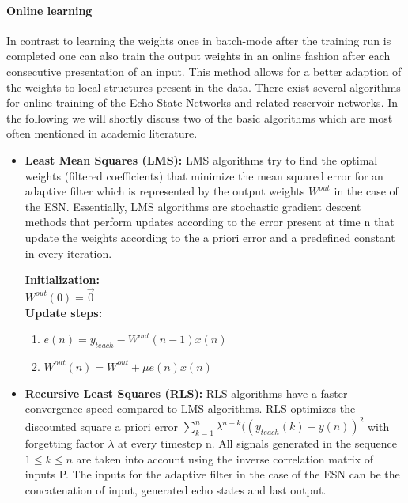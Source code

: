 \paragraph*{Online learning}
In contrast to learning the weights once in batch-mode after the training run is completed one can also train the output weights in an online fashion after each consecutive presentation of an input. This method allows for a better adaption of the weights to local structures present in the data. There exist several algorithms for online training of the Echo State Networks and related reservoir networks. In the following we will shortly discuss two of the basic algorithms which are most often mentioned in academic literature. 
\begin{itemize}
\item \textbf{Least Mean Squares (LMS):} LMS algorithms try to find the optimal weights (filtered coefficients) that minimize the mean squared error for an adaptive filter which is represented by the output weights $W^{out}$ in the case of the ESN. Essentially, LMS algorithms are stochastic gradient descent methods that perform updates according to the error present at time n that update the weights according to the a priori error and a predefined constant in every iteration.\\
\indent
\begin{algorithm}[H]
\textbf{Initialization:}\\
$W^{out}(0) = \vec{0}$\\
\textbf{Update steps:}\\
\begin{enumerate}
\item $e(n) = y_{teach}-W^{out}(n-1)x(n)$
\item $W^{out}(n)=W^{out}+\mu e(n)x(n)$
\end{enumerate}
\end{algorithm}
\item \textbf{Recursive Least Squares (RLS):} RLS algorithms have a faster convergence speed compared to LMS algorithms. RLS optimizes the discounted square a priori error $\sum_{k=1}^{n} \lambda^{n-k}((y_{teach}(k) - y(n))^2$ with forgetting factor $\lambda$ at every timestep n. All signals generated in the sequence $1 \leq k \leq n$ are taken into account using the inverse correlation matrix of inputs P. The inputs for the adaptive filter in the case of the ESN can be the concatenation of input, generated echo states and last output.\\
\indent
\begin{algorithm}[H]

\end{algorithm}
\end{itemize}
